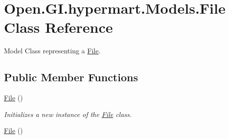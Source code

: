 \hypertarget{class_open_1_1_g_i_1_1hypermart_1_1_models_1_1_file}{}\section{Open.\+G\+I.\+hypermart.\+Models.\+File Class Reference}
\label{class_open_1_1_g_i_1_1hypermart_1_1_models_1_1_file}


Model Class representing a \hyperlink{class_open_1_1_g_i_1_1hypermart_1_1_models_1_1_file}{File}.  


\subsection*{Public Member Functions}
\begin{DoxyCompactItemize}
\item 
\hyperlink{class_open_1_1_g_i_1_1hypermart_1_1_models_1_1_file_a6834fcf6e0ea0428dc2decfaa974f8d2}{File} ()
\begin{DoxyCompactList}\small\item\em Initializes a new instance of the \hyperlink{class_open_1_1_g_i_1_1hypermart_1_1_models_1_1_file}{File} class. \end{DoxyCompactList}\item 
\hyperlink{class_open_1_1_g_i_1_1hypermart_1_1_models_1_1_file_a6834fcf6e0ea0428dc2decfaa974f8d2}{File} ()
\end{DoxyCompactItemize}

